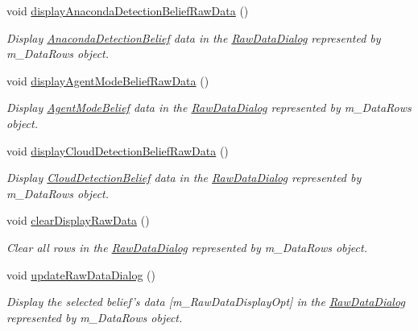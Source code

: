 \begin{DoxyCompactItemize}
void \hyperlink{class_belief_collection_a2373bd445c1f9067bb96d1d97f166b88}{displayAnacondaDetectionBeliefRawData} ()
\begin{DoxyCompactList}\small\item\em Display \hyperlink{class_anaconda_detection_belief}{AnacondaDetectionBelief} data in the \hyperlink{class_raw_data_dialog}{RawDataDialog} represented by m\_\-DataRows object. \end{DoxyCompactList}\item 
void \hyperlink{class_belief_collection_ad80583536515650193239aa6ab97d5b5}{displayAgentModeBeliefRawData} ()
\begin{DoxyCompactList}\small\item\em Display \hyperlink{class_agent_mode_belief}{AgentModeBelief} data in the \hyperlink{class_raw_data_dialog}{RawDataDialog} represented by m\_\-DataRows object. \end{DoxyCompactList}\item 
void \hyperlink{class_belief_collection_ab6df8f670bc26729bb66665ed78e68af}{displayCloudDetectionBeliefRawData} ()
\begin{DoxyCompactList}\small\item\em Display \hyperlink{class_cloud_detection_belief}{CloudDetectionBelief} data in the \hyperlink{class_raw_data_dialog}{RawDataDialog} represented by m\_\-DataRows object. \end{DoxyCompactList}\item 
void \hyperlink{class_belief_collection_a5792edcd8a6a2ed43336c0f940645dcf}{clearDisplayRawData} ()
\begin{DoxyCompactList}\small\item\em Clear all rows in the \hyperlink{class_raw_data_dialog}{RawDataDialog} represented by m\_\-DataRows object. \end{DoxyCompactList}\item 
void \hyperlink{class_belief_collection_a5ff35db55afff638f0cf605d3e6927ca}{updateRawDataDialog} ()
\begin{DoxyCompactList}\small\item\em Display the selected belief's data \mbox{[}m\_\-RawDataDisplayOpt\mbox{]} in the \hyperlink{class_raw_data_dialog}{RawDataDialog} represented by m\_\-DataRows object. \end{DoxyCompactList}\end{DoxyCompactItemize}
